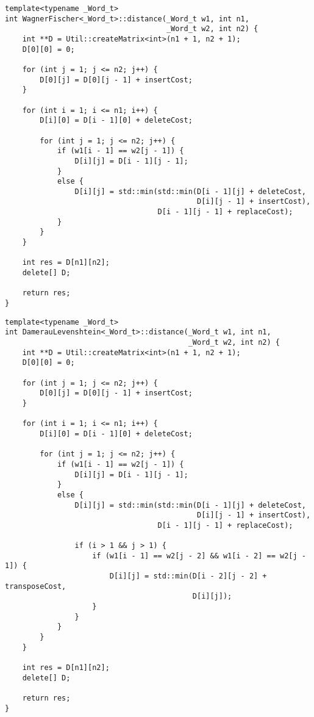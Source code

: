 \noindent\begin{minipage}{\textwidth}
\begin{lstlisting}[caption=Расстояние Левенштейна (матричная реализация)]
template<typename _Word_t>
int WagnerFischer<_Word_t>::distance(_Word_t w1, int n1,
                                     _Word_t w2, int n2) {
    int **D = Util::createMatrix<int>(n1 + 1, n2 + 1);
    D[0][0] = 0;

    for (int j = 1; j <= n2; j++) {
        D[0][j] = D[0][j - 1] + insertCost;
    }

    for (int i = 1; i <= n1; i++) {
        D[i][0] = D[i - 1][0] + deleteCost;

        for (int j = 1; j <= n2; j++) {
            if (w1[i - 1] == w2[j - 1]) {
                D[i][j] = D[i - 1][j - 1];
            }
            else {
                D[i][j] = std::min(std::min(D[i - 1][j] + deleteCost,
                                            D[i][j - 1] + insertCost),
                                   D[i - 1][j - 1] + replaceCost);
            }
        }
    }

    int res = D[n1][n2];
    delete[] D;

    return res;
}
\end{lstlisting}
\end{minipage}

\noindent\begin{minipage}{\textwidth}
\begin{lstlisting}[caption=Расстояние Дамерау-Левенштейна (матричная реализация)]
template<typename _Word_t>
int DamerauLevenshtein<_Word_t>::distance(_Word_t w1, int n1,
                                          _Word_t w2, int n2) {
    int **D = Util::createMatrix<int>(n1 + 1, n2 + 1);
    D[0][0] = 0;

    for (int j = 1; j <= n2; j++) {
        D[0][j] = D[0][j - 1] + insertCost;
    }

    for (int i = 1; i <= n1; i++) {
        D[i][0] = D[i - 1][0] + deleteCost;

        for (int j = 1; j <= n2; j++) {
            if (w1[i - 1] == w2[j - 1]) {
                D[i][j] = D[i - 1][j - 1];
            }
            else {
                D[i][j] = std::min(std::min(D[i - 1][j] + deleteCost,
                                            D[i][j - 1] + insertCost),
                                   D[i - 1][j - 1] + replaceCost);

                if (i > 1 && j > 1) {
                    if (w1[i - 1] == w2[j - 2] && w1[i - 2] == w2[j - 1]) {
                        D[i][j] = std::min(D[i - 2][j - 2] + transposeCost,
                                           D[i][j]);
                    }
                }
            }
        }
    }

    int res = D[n1][n2];
    delete[] D;

    return res;
}
\end{lstlisting}
\end{minipage}

